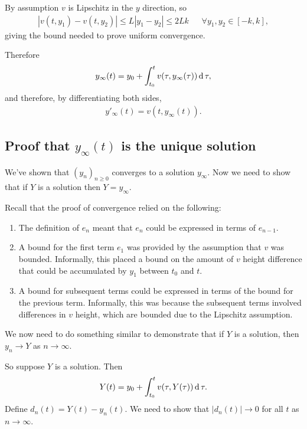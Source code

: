 By assumption $v$ is Lipschitz in the $y$ direction, so
\begin{align*}
  |v(t, y_1) - v(t, y_2)| \leq L|y_1 - y_2| \leq 2Lk ~~~~~~~\forall y_1, y_2 \in [-k, k],
\end{align*}
giving the bound needed to prove uniform convergence.

Therefore
\begin{align*}
  y_\infty(t) = y_0 + \int_{t_0}^t v(\tau, y_\infty(\tau)) \operatorname{\text{d}}\tau,
\end{align*}
and therefore, by differentiating both sides,
\begin{align*}
  y'_\infty(t) = v(t, y_\infty(t)).
\end{align*}

\subsection{Proof that $y_\infty(t)$ is the unique solution}

We've shown that $(y_n)_{n\geq 0}$ converges to a solution $y_\infty$. Now we
need to show that if $Y$ is a solution then $Y = y_\infty$.

Recall that the proof of convergence relied on the following:
\begin{enumerate}
\item The definition of $e_n$ meant that $e_n$ could be expressed in terms of $e_{n-1}$.
\item A bound for the first term $e_1$ was provided by the assumption that $v$
  was bounded. Informally, this placed a bound on the amount of $v$ height
  difference that could be accumulated by $y_1$ between $t_0$ and $t$.
\item A bound for subsequent terms could be expressed in terms of the bound for
  the previous term. Informally, this was because the subsequent terms involved
  differences in $v$ height, which are bounded due to the Lipschitz
  assumption.
\end{enumerate}

We now need to do something similar to demonstrate that if $Y$ is a solution,
then $y_n \to Y$ as $n \to \infty$.

So suppose $Y$ is a solution. Then
\begin{align*}
  Y(t) = y_0 + \int_{t_0}^t v(\tau, Y(\tau)) \operatorname{\text{d}}\tau.
\end{align*}
Define $d_n(t) = Y(t) - y_n(t)$. We need to show that $|d_n(t)| \to 0$ for all
$t$ as $n \to \infty$.\\

